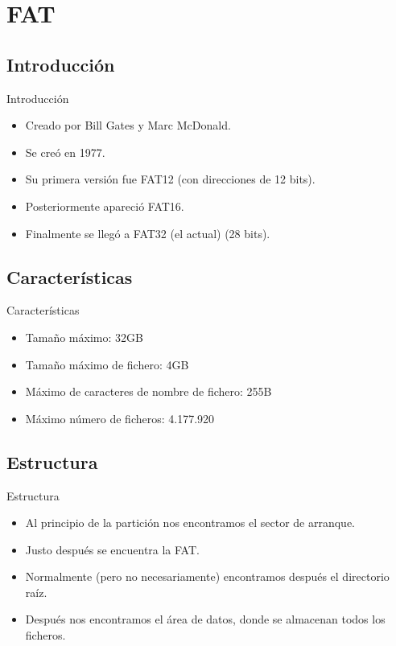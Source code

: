 \section{FAT}
\subsection{Introducción}
\begin{frame}{Introducción}
  \begin{itemize}
    \item Creado por Bill Gates y Marc McDonald.
    \item Se creó en 1977.
    \item Su primera versión fue FAT12 (con direcciones de 12 bits).
    \item Posteriormente apareció FAT16.
    \item Finalmente se llegó a FAT32 (el actual) (28 bits).
  \end{itemize}
\end{frame}

\subsection{Características}
\begin{frame}{Características}
  \begin{itemize}
    \item Tamaño máximo: 32GB
    \item Tamaño máximo de fichero: 4GB
    \item Máximo de caracteres de nombre de fichero: 255B
    \item Máximo número de ficheros: 4.177.920
  \end{itemize}
\end{frame}

\subsection{Estructura}
\begin{frame}{Estructura}
  \begin{itemize}
    \item Al principio de la partición nos encontramos el sector de arranque.
    \item Justo después se encuentra la FAT.
    \item Normalmente (pero no necesariamente) encontramos después el directorio raíz.
    \item Después nos encontramos el área de datos, donde se almacenan todos los ficheros.
  \end{itemize}
\end{frame}

